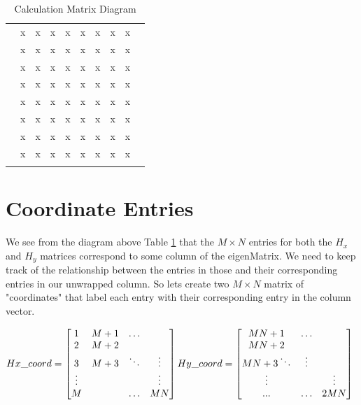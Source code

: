 \documentclass[letter]{article}
\begin{document}
		 \begin{table}[h]
		\centering
		\begin{tabular}{|c|c|c|c|c|c|c|c|c|c|}
		\hline
			 &   &   &   &   &   &   &   &   &  \\ \hline
			 & x & x & x & x & x & x & x & x &  \\ \hline
			 & x & x & x & x & x & x & x & x &  \\ \hline
			 & x & x & x & x & x & x & x & x &  \\ \hline
			 & x & x & x & x & x & x & x & x &  \\ \hline
			 & x & x & x & x & x & x & x & x &  \\ \hline
			 & x & x & x & x & x & x & x & x &  \\ \hline
			 & x & x & x & x & x & x & x & x &  \\ \hline
			 & x & x & x & x & x & x & x & x &  \\ \hline
			 &   &   &   &   &   &   &   &   &  \\ \hline
			\end{tabular}
		\caption{Calculation Matrix Diagram}
		\label{table:calculation_matrix_diagram}
	\end{table}	
	
	
		 
		\section*{Coordinate Entries}
			We see from the diagram above Table \ref{table:calculation_matrix_diagram} that the $M \times N$ entries for both the $H_x$ and $H_y$ matrices correspond to some column of the eigenMatrix. We need to keep track of the relationship between the entries in those and their corresponding entries in our unwrapped column. So lets create two $M \times N$ matrix of "coordinates" that label each entry with their corresponding entry in the column vector.\\
			
			\begin{center}
			$Hx\_coord = 
			\begin{bmatrix}
				1 & M+1 &  \hdots &  \\
				2 & M+2 &    &  \\
				3 & M+3 &  \ddots & \vdots \\
				\vdots &    &  & \vdots \\
				M &  & \hdots   & MN 
			\end{bmatrix} 
			\linebreak \linebreak
			Hy\_coord = 
			\begin{bmatrix}
				MN+1  &  \hdots &  \\
				MN+2  &    &  \\
				MN+3   \ddots & \vdots \\
				\vdots &      & \vdots \\
				... &  \hdots   & 2MN 
			\end{bmatrix} $
			\end{center}
\end{document}
